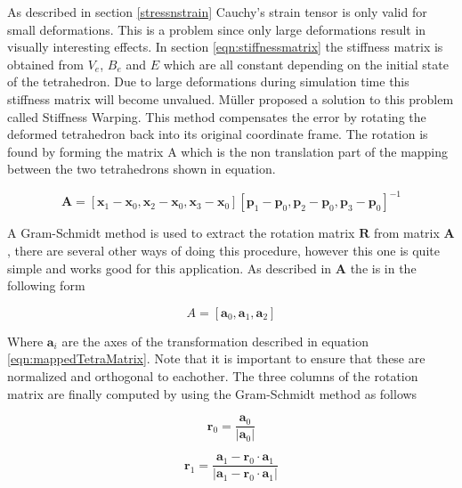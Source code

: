 As described in section \ref{stressnstrain} Cauchy’s strain tensor is only valid for small deformations. This is a problem since only large deformations result in visually interesting effects. In section \ref{eqn:stiffnessmatrix} the stiffness matrix is obtained from $V_{e}$, $B_{e}$ and $E$ which are all constant depending on the initial state of the tetrahedron. Due to large deformations during simulation time this stiffness matrix will become unvalued. M\"uller \cite{muller_ivm} proposed a solution to this problem called Stiffness Warping. This method compensates the error by rotating the deformed tetrahedron back into its original coordinate frame. The rotation is found by forming the matrix A which is the non translation part of the mapping between the two tetrahedrons shown in equation.

\begin{equation}\label{eqn:mappedTetraMatrix}
    \mathbf{A} = [\mathbf{x}_{1}-\mathbf{x}_{0}, \mathbf{x}_{2}-\mathbf{x}_{0}, \mathbf{x}_{3}-\mathbf{x}_{0}][\mathbf{p}_{1}-\mathbf{p}_{0}, \mathbf{p}_{2}-\mathbf{p}_{0}, \mathbf{p}_{3}-\mathbf{p}_{0}]^{-1}
\end{equation}

A Gram-Schmidt method is used to extract the rotation matrix $\mathbf{R}$  from matrix $\mathbf{A}$ , there are several other ways of doing this procedure, however this one is quite simple and works good for this application. As described in \cite{rt_phys} $\mathbf{A}$ the is in the following form

\begin{equation}\label{eqn:transformationAxes}
    A =[\mathbf{a}_0, \mathbf{a}_1,\mathbf{a}_2]
\end{equation}

Where $\mathbf{a}_i$ are the axes of the transformation described in equation \ref{eqn:mappedTetraMatrix}. Note that it is important to ensure that these are normalized and orthogonal to eachother. The three columns of the rotation matrix are finally computed by using the Gram-Schmidt method as follows

\begin{equation}\label{eqn:r0}
    \mathbf{r}_0 = \frac{\mathbf{a}_0}{| \mathbf{a}_0 |}
\end{equation}

\begin{equation}\label{eqn:r1}
    \mathbf{r}_1 = \frac{\mathbf{a}_1 -  \mathbf{r}_0 \cdot \mathbf{a}_1}{| \mathbf{a}_1 -  \mathbf{r}_0 \cdot \mathbf{a}_1 |}
\end{equation}

